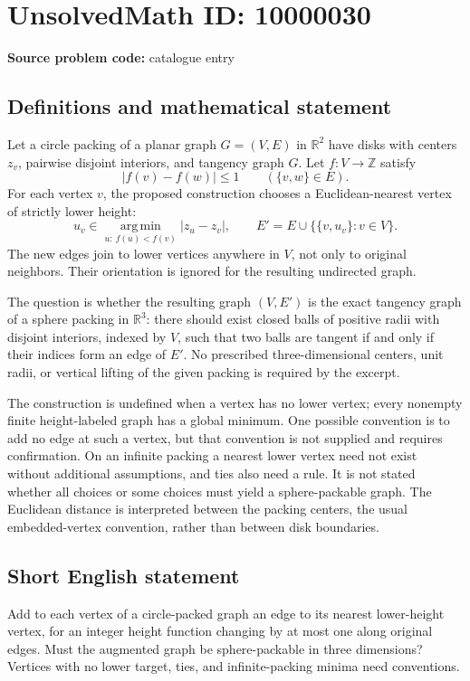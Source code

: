 \documentclass[11pt]{article}
\newcommand{\Z}{\mathbb{Z}}
\newcommand{\R}{\mathbb{R}}
\begin{document}
\section*{UnsolvedMath ID: 10000030}
\textbf{Source problem code:} catalogue entry
\subsection{Definitions and mathematical statement}
Let a circle packing of a planar graph \(G=(V,E)\) in \(\R^2\) have disks with centers \(z_v\), pairwise disjoint interiors, and tangency graph \(G\). Let \(f:V\to\Z\) satisfy
\[
 |f(v)-f(w)|\leq1\qquad(\{v,w\}\in E).
\]
For each vertex \(v\), the proposed construction chooses a Euclidean-nearest vertex of strictly lower height:
\[
 u_v\in\operatorname*{arg\,min}_{u:\ f(u)<f(v)}|z_u-z_v|,
 \qquad E'=E\cup\{\{v,u_v\}:v\in V\}.
\]
The new edges join to lower vertices anywhere in \(V\), not only to original neighbors. Their orientation is ignored for the resulting undirected graph.

The question is whether the resulting graph \((V,E')\) is the exact tangency graph of a sphere packing in \(\R^3\): there should exist closed balls of positive radii with disjoint interiors, indexed by \(V\), such that two balls are tangent if and only if their indices form an edge of \(E'\). No prescribed three-dimensional centers, unit radii, or vertical lifting of the given packing is required by the excerpt.

The construction is undefined when a vertex has no lower vertex; every nonempty finite height-labeled graph has a global minimum. One possible convention is to add no edge at such a vertex, but that convention is not supplied and requires confirmation. On an infinite packing a nearest lower vertex need not exist without additional assumptions, and ties also need a rule. It is not stated whether all choices or some choices must yield a sphere-packable graph. The Euclidean distance is interpreted between the packing centers, the usual embedded-vertex convention, rather than between disk boundaries.
\subsection{Short English statement}
Add to each vertex of a circle-packed graph an edge to its nearest lower-height vertex, for an integer height function changing by at most one along original edges. Must the augmented graph be sphere-packable in three dimensions? Vertices with no lower target, ties, and infinite-packing minima need conventions.
\end{document}
